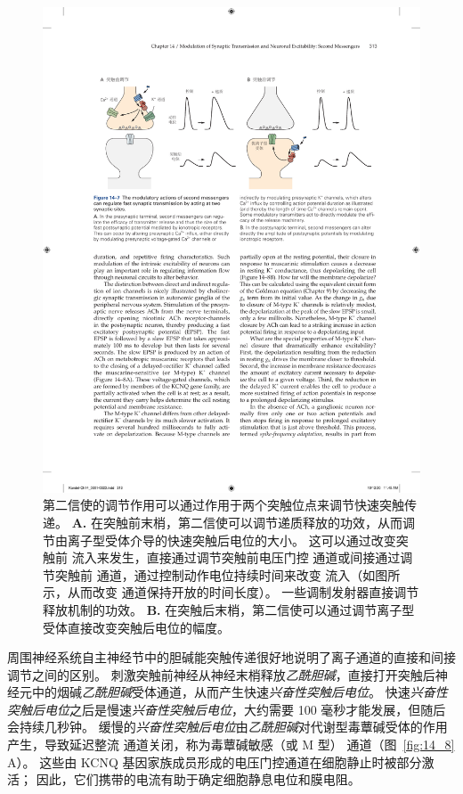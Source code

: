 \begin{figure}[htbp]
	\centering
	\includegraphics[width=0.9\linewidth]{chap14/fig_14_7}
	\caption{第二信使的调节作用可以通过作用于两个突触位点来调节快速突触传递。
		\textbf{A.} 在突触前末梢，第二信使可以调节递质释放的功效，从而调节由离子型受体介导的快速突触后电位的大小。
		这可以通过改变突触前  流入来发生，直接通过调节突触前电压门控  通道或间接通过调节突触前  通道，通过控制动作电位持续时间来改变  流入（如图所示，从而改变  通道保持开放的时间长度）。
		一些调制发射器直接调节释放机制的功效。 
		\textbf{B.} 在突触后末梢，第二信使可以通过调节离子型受体直接改变突触后电位的幅度。}
	\label{fig:14_7}
\end{figure}


周围神经系统自主神经节中的胆碱能突触传递很好地说明了离子通道的直接和间接调节之间的区别。
刺激突触前神经从神经末梢释放\textit{乙酰胆碱}，直接打开突触后神经元中的烟碱\textit{乙酰胆碱}受体通道，从而产生快速\textit{兴奋性突触后电位}。
快速\textit{兴奋性突触后电位}之后是慢速\textit{兴奋性突触后电位}，大约需要 100 毫秒才能发展，但随后会持续几秒钟。
缓慢的\textit{兴奋性突触后电位}由\textit{乙酰胆碱}对代谢型毒蕈碱受体的作用产生，导致延迟整流  通道关闭，称为毒蕈碱敏感（或 M 型） 通道（图~\ref{fig:14_8} A）。
这些由 KCNQ 基因家族成员形成的电压门控通道在细胞静止时被部分激活；
因此，它们携带的电流有助于确定细胞静息电位和膜电阻。


